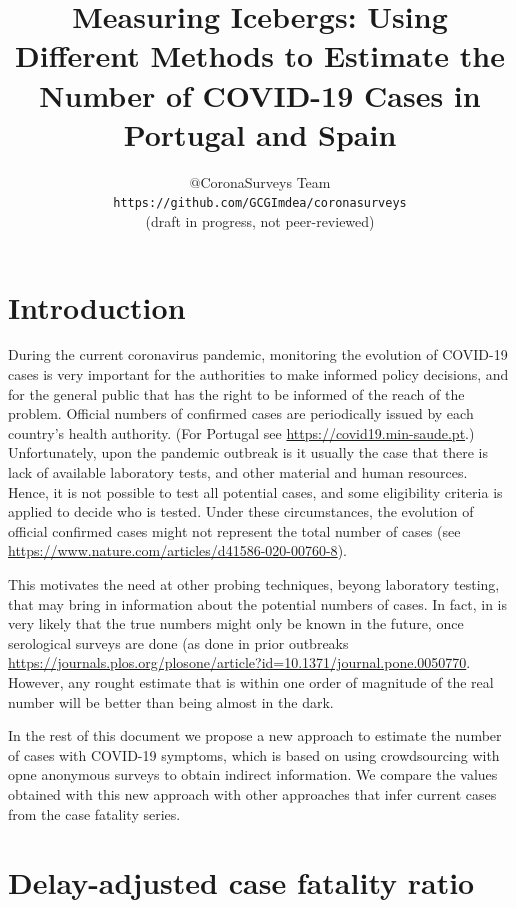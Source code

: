 \documentclass{article}
\begin{document}
\title{Measuring Icebergs: Using Different Methods to Estimate the Number of COVID-19 Cases in Portugal and Spain}
\author{$@$CoronaSurveys Team \\ \texttt{https://github.com/GCGImdea/coronasurveys}\\(draft in progress, not peer-reviewed)}
\maketitle
\section{Introduction}

During the current coronavirus pandemic, monitoring the evolution of COVID-19 cases is very important for the authorities to make
informed policy decisions, and for the general public that has the right to be informed of the reach of the problem. 
Official numbers of confirmed cases are periodically issued by each country's health authority. (For Portugal see \url{https://covid19.min-saude.pt}.)
Unfortunately, upon the pandemic outbreak is it usually the case that there is lack of available laboratory tests, and other material and human resources. Hence, it is not possible to test all potential cases, and some eligibility criteria is applied to decide who is tested.
Under these circumstances, the evolution of official confirmed cases might not represent the total number of cases (see \url{https://www.nature.com/articles/d41586-020-00760-8}).  

This motivates the need at other probing techniques, beyong laboratory testing, that may bring in information about the potential numbers of cases. In fact, in is very likely that the true numbers might only be known in the future, once serological surveys are done (as done in prior outbreaks \url{https://journals.plos.org/plosone/article?id=10.1371/journal.pone.0050770}. However, any rought estimate that is within one order of magnitude of the real number will be better than being almost in the dark.

In the rest of this document we propose a new approach to estimate the number of cases with COVID-19 symptoms, which is based on using crowdsourcing with opne anonymous surveys to obtain indirect information. We compare the values obtained with this new approach with other approaches that infer current cases from the case fatality series.

\section{Delay-adjusted case fatality ratio}
\end{document}
